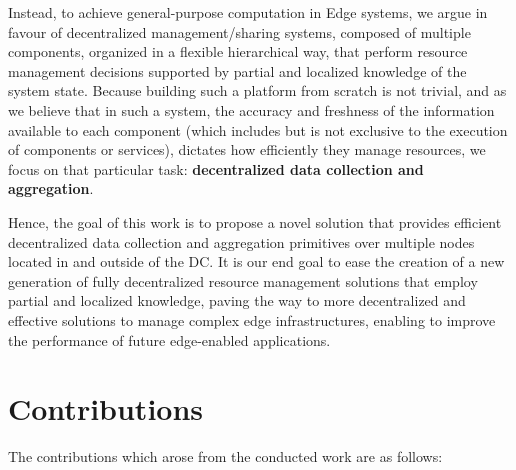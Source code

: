 Instead, to achieve general-purpose computation in Edge systems, we argue in favour of decentralized management/sharing systems, composed of multiple components, organized in a flexible hierarchical way, that perform resource management decisions supported by partial and localized knowledge of the system state. Because building such a platform from scratch is not trivial, and as we believe that in such a system, the accuracy and freshness of the information available to each component (which includes but is not exclusive to the execution of components or services), dictates how efficiently they manage resources, we focus on that particular task: \textbf{decentralized data collection and aggregation}.

Hence, the goal of this work is to propose a novel solution that provides efficient decentralized data collection and aggregation primitives over multiple nodes located in and outside of the DC. It is our end goal to ease the creation of a new generation of fully decentralized resource management solutions that employ partial and localized knowledge, paving the way to more decentralized and effective solutions to manage complex edge infrastructures, enabling to improve the performance of future edge-enabled applications.



\section{Contributions}

The contributions which arose from the conducted work are as follows:

